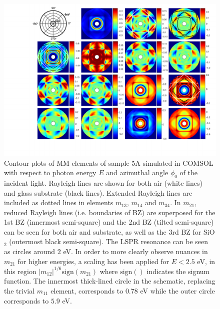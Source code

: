 \begin{figure}[h!]  %
    \centering
    \includegraphics[width=\linewidth, trim=3cm 1.5cm 0.5cm 0cm, clip]{figures/ch4/S5A/contour/Muller_rot_S5A_COMSOLSIM_55_m21scaledtopower1over6_final.pdf}
    \caption{Contour plots of MM elements of sample 5A simulated in COMSOL with respect to photon energy $E$ and azimuthal angle $\phi_0$ of the incident light. Rayleigh lines are shown for both air (white lines) and glass substrate (black lines). Extended Rayleigh lines are included as dotted lines in elements $m_{13}$, $m_{14}$ and $m_{34}$. In $m_{21}$, reduced Rayleigh lines (i.e. boundaries of BZ) are superposed for the 1st BZ (innermost semi-square) and the 2nd BZ (tilted semi-square) can be seen for both air and substrate, as well as the 3rd BZ for SiO$_2$ (outermost black semi-square). The LSPR resonance can be seen as circles around $2$ eV. In order to more clearly observe nuances in $m_{21}$ for higher energies, a scaling has been applied for $E<2.5$ eV, in this region $|m_{12}|^{1/6}\text{sign}(m_{21})$ where $\text{sign}()$ indicates the signum function. The innermost thick-lined circle in the schematic, replacing the trivial $m_{11}$ element, corresponds to $0.78$ eV while the outer circle corresponds to $5.9$ eV.}
    \label{fig:S5A_contour_MM}
\end{figure}
